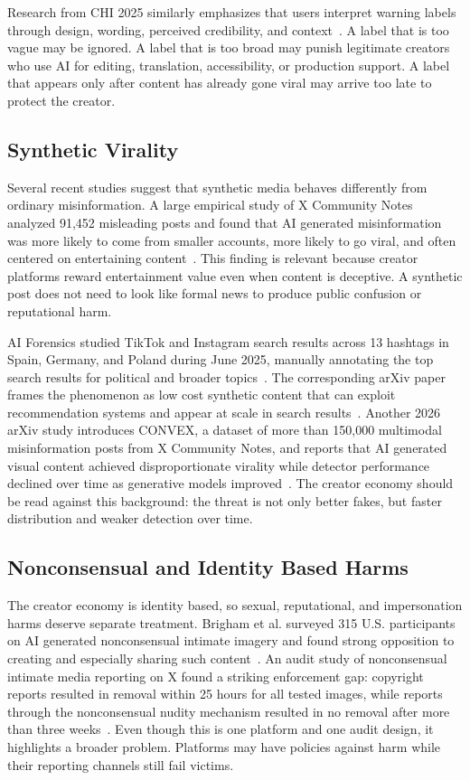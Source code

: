 \documentclass[11pt]{article}
\begin{document}
Research from CHI 2025 similarly emphasizes that users interpret warning labels through design, wording, perceived credibility, and context~\cite{gamage2025labeling}. A label that is too vague may be ignored. A label that is too broad may punish legitimate creators who use AI for editing, translation, accessibility, or production support. A label that appears only after content has already gone viral may arrive too late to protect the creator.

\subsection{Synthetic Virality}

Several recent studies suggest that synthetic media behaves differently from ordinary misinformation. A large empirical study of X Community Notes analyzed 91,452 misleading posts and found that AI generated misinformation was more likely to come from smaller accounts, more likely to go viral, and often centered on entertaining content~\cite{jiang2025misinformation}. This finding is relevant because creator platforms reward entertainment value even when content is deceptive. A synthetic post does not need to look like formal news to produce public confusion or reputational harm.

AI Forensics studied TikTok and Instagram search results across 13 hashtags in Spain, Germany, and Poland during June 2025, manually annotating the top search results for political and broader topics~\cite{aiforensics2025virality}. The corresponding arXiv paper frames the phenomenon as low cost synthetic content that can exploit recommendation systems and appear at scale in search results~\cite{aiforensicsArxiv2025}. Another 2026 arXiv study introduces CONVEX, a dataset of more than 150,000 multimodal misinformation posts from X Community Notes, and reports that AI generated visual content achieved disproportionate virality while detector performance declined over time as generative models improved~\cite{chrysidis2026synthetic}. The creator economy should be read against this background: the threat is not only better fakes, but faster distribution and weaker detection over time.

\subsection{Nonconsensual and Identity Based Harms}

The creator economy is identity based, so sexual, reputational, and impersonation harms deserve separate treatment. Brigham et al. surveyed 315 U.S. participants on AI generated nonconsensual intimate imagery and found strong opposition to creating and especially sharing such content~\cite{brigham2024violation}. An audit study of nonconsensual intimate media reporting on X found a striking enforcement gap: copyright reports resulted in removal within 25 hours for all tested images, while reports through the nonconsensual nudity mechanism resulted in no removal after more than three weeks~\cite{li2024reporting}. Even though this is one platform and one audit design, it highlights a broader problem. Platforms may have policies against harm while their reporting channels still fail victims.
\end{document}
